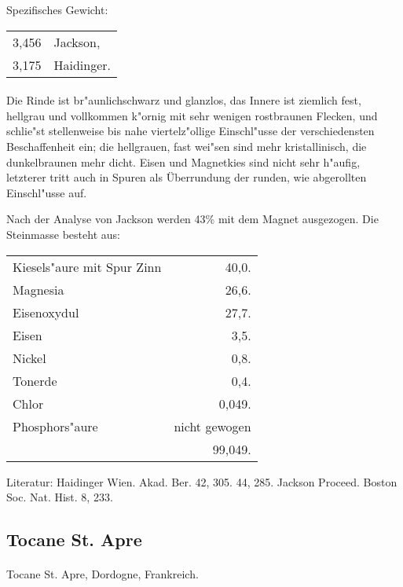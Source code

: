\documentclass[a4paper, 11pt, oneside]{article}
\begin{document}
Spezifisches Gewicht:  
\begin{table}[!ht]
    \centering
    \begin{tabular}{l l}
        3,456 & Jackson,\\
        3,175 & Haidinger.
    \end{tabular}
\end{table}
\paragraph{}
Die Rinde ist br"aunlichschwarz und glanzlos, das Innere ist ziemlich fest, hellgrau und vollkommen k"ornig mit sehr wenigen rostbraunen Flecken, und schlie"st stellenweise bis nahe viertelz"ollige Einschl"usse der verschiedensten Beschaffenheit ein; die hellgrauen, fast wei"sen sind mehr kristallinisch, die dunkelbraunen mehr dicht. Eisen und Magnetkies sind nicht sehr h"aufig, letzterer tritt auch in Spuren als Überrundung der runden, wie abgerollten Einschl"usse auf.

Nach der Analyse von Jackson werden 43\% mit dem Magnet ausgezogen. Die Steinmasse besteht aus:
\begin{table}[H]
    \centering
    \begin{tabular}{l r}
        Kiesels"aure mit Spur Zinn  & 40,0. \\
        Magnesia & 26,6. \\
        Eisenoxydul & 27,7. \\
        Eisen & 3,5. \\
        Nickel & 0,8. \\
        Tonerde & 0,4. \\
        Chlor & 0,049. \\
        Phosphors"aure & nicht gewogen \\
         & 99,049. \\
    \end{tabular}
\end{table}

\footnotesize
Literatur: Haidinger Wien. Akad. Ber. 42, 305. 44, 285. Jackson Proceed. Boston Soc. Nat. Hist. 8, 233.

\subsection{Tocane St. Apre}
\normalsize
\paragraph{}
Tocane St. Apre, Dordogne, Frankreich.
\end{document}
